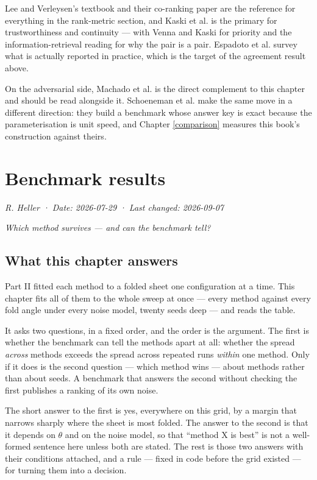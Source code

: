 \documentclass[
  british,
  a4paper,
]{book}
\begin{document}
Lee and Verleysen's textbook \citep{lee2007nonlinear} and their co-ranking paper
\citep{lee2009quality} are the reference for everything in the rank-metric section,
and Kaski et al. \citep{kaski2003trustworthiness} is the primary for trustworthiness
and continuity --- with Venna and Kaski \citep{venna2001neighborhood} for priority and
the information-retrieval reading \citep{venna2010information} for why the pair is a
pair. Espadoto et al. \citep{espadoto2021survey} survey what is actually reported in
practice, which is the target of the agreement result above.

On the adversarial side, Machado et al. \citep{machado2025necessary} is the direct
complement to this chapter and should be read alongside it. Schoeneman et al.
\citep{schoeneman2017error} make the same move in a different direction: they build a
benchmark whose answer key is exact because the parameterisation is unit speed,
and Chapter \ref{comparison} measures this book's construction against theirs.

\chapter{Benchmark results}\label{results}

\emph{R. Heller · Date: 2026-07-29 · Last changed: 2026-09-07}

\emph{Which method survives --- and can the benchmark tell?}

\section{What this chapter answers}\label{results-question}

Part II fitted each method to a folded sheet one configuration at a time. This
chapter fits all of them to the whole sweep at once --- every method against every
fold angle under every noise model, twenty seeds deep --- and reads the table.

It asks two questions, in a fixed order, and the order is the argument. The
first is whether the benchmark can tell the methods apart at all: whether the
spread \emph{across} methods exceeds the spread across repeated runs \emph{within} one
method. Only if it does is the second question --- which method wins --- about
methods rather than about seeds. A benchmark that answers the second without
checking the first publishes a ranking of its own noise.

The short answer to the first is yes, everywhere on this grid, by a margin that
narrows sharply where the sheet is most folded. The answer to the second is that
it depends on \(\theta\) and on the noise model, so that ``method X is best'' is not
a well-formed sentence here unless both are stated. The rest is those two
answers with their conditions attached, and a rule --- fixed in code before the
grid existed --- for turning them into a decision.
\end{document}
